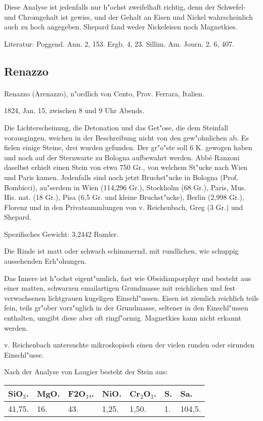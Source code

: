 \documentclass[a4paper, 11pt, oneside]{article}
\begin{document}
Diese Analyse ist jedenfalls nur h"ochst zweifelhaft richtig, denn der Schwefel- und Chromgehalt ist gewiss, und der Gehalt an Eisen und Nickel wahrscheinlich auch zu hoch angegeben. Shepard fand weder Nickeleisen noch Magnetkies.

\footnotesize
Literatur: Poggend. Ann. 2, 153. Ergb. 4, 23. Sillim. Am. Journ. 2. 6, 407.
\subsection{Renazzo}
\normalsize
\paragraph{}
Renazzo (Arenazzo), n"ordlich von Cento, Prov. Ferrara, Italien.

1824, Jan. 15, zwischen 8 und 9 Uhr Abends.

Die Lichterscheinung, die Detonation und das Get"ose, die dem Steinfall vorausgingen, weichen in der Beschreibung nicht von den gew"ohnlichen ab. Es fielen einige Steine, drei wurden gefunden. Der gr"o"ste soll 6 K. gewogen haben und noch auf der Sternwarte zu Bologna aufbewahrt werden. Abbé Ranzoni daselbst erhielt einen Stein von etwa 750 Gr., von welchem St"ucke nach Wien und Paris kamen. Jedenfalls sind noch jetzt Bruchst"ucke in Bologna (Prof. Bombicci), au"serdem in Wien (114,296 Gr.), Stockholm (68 Gr.), Paris, Mus. His. nat. (18 Gr.), Pisa (6,5 Gr. und kleine Bruchst"ucke), Berlin (2,998 Gr.), Florenz und in den Privatsammlungen von v. Reichenbach, Greg (3 Gr.) und Shepard.

Spezifisches Gewicht: 3,2442 Rumler.

Die Rinde ist matt oder schwach schimmernd, mit rundlichen, wie schuppig aussehenden Erh"ohungen.

Das Innere ist h"ochst eigent"umlich, fast wie Obsidianporphyr und besteht aus einer matten, schwarzen emailartigen Grundmasse mit reichlichen und fest verwachsenen lichtgrauen kugeligen Einschl"ussen. Eisen ist ziemlich reichlich teils fein, teils gr"ober vorz"uglich in der Grundmasse, seltener in den Einschl"ussen enthalten, umgibt diese aber oft ringf"ormig. Magnetkies kann nicht erkannt werden.

v. Reichenbach untersuchte mikroskopisch einen der vielen runden oder eirunden Einschl"usse.

Nach der Analyse von Laugier besteht der Stein aus:
\begin{table}[!ht]
    \centering
    \begin{tabular}{l l l l l l l}
        SiO$_{3}$. & MgO. & F2O$_{3}$,. & NiO. & Cr$_{2}$O$_{3}$. & S. & Sa. \\ \hline
        41,75. & 16. & 43. & 1,25. & 1,50. & 1. & 104,5. \\
    \end{tabular}
\end{table}
\end{document}
